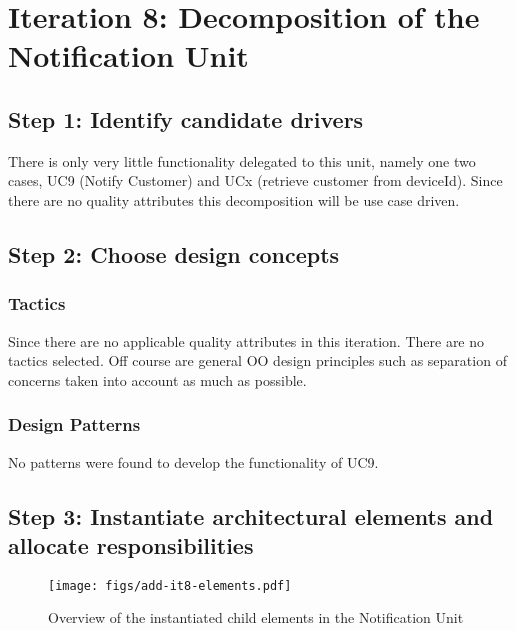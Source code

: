 \section{Iteration 8: Decomposition of the Notification Unit}
\label{add:it8}

\subsection{Step 1: Identify candidate drivers}
\label{add:it8/drivers}

\npar There is only very little functionality delegated to this unit, namely one
two cases, UC9 (Notify Customer) and UCx (retrieve customer from deviceId).
Since there are no quality attributes this decomposition will be use case
driven.

\subsection{Step 2: Choose design concepts}
\label{add:it8/concepts}

\subsubsection{Tactics}
\label{add:it8/tactics}

\npar Since there are no applicable quality attributes in this iteration. There
are no tactics selected. Off course are general OO design principles such as
separation of concerns taken into account as much as possible.

\subsubsection{Design Patterns}
\label{add:it8/patterns}

\npar No patterns were found to develop the functionality of UC9.

\subsection{Step 3: Instantiate architectural elements and allocate responsibilities}
\label{add:it8/elements}

\begin{figure}[H]
	\begin{centering}
		\texttt{[image: figs/add-it8-elements.pdf]}
		\caption{Overview of the instantiated child elements in the Notification Unit}
		\label{fig:it8/elements}
	\end{centering}
\end{figure}

